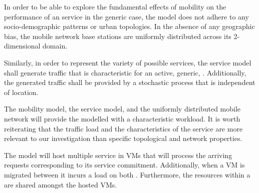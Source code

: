 In order to be able to explore the fundamental effects of mobility on the performance of an \xcloud{} service in the generic case, the model does not adhere to any socio-demographic patterns or urban topologies. In the absence of any geographic bias, the mobile network base stations are uniformly distributed across its 2-dimensional domain.

Similarly, in order to represent the variety of possible services, the service model shall generate traffic that is characteristic for an active, generic, \ue{}. Additionally, the generated traffic shall be provided by a stochastic process that is independent of location.

The mobility model, the service model, and the uniformly distributed mobile network will provide the modelled \dcs{} with a characteristic workload. It is worth reiterating that the traffic load and the characteristics of the service are more relevant to our investigation than specific topological and network properties.

The \dc{} model will host multiple service in VMs that will process the arriving requests corresponding to its service commitment. Additionally, when a VM is migrated between \dcs{} it incurs a load on both \dcs{}. Furthermore, the resources within a \dc{} are shared amongst the hosted VMs. %
